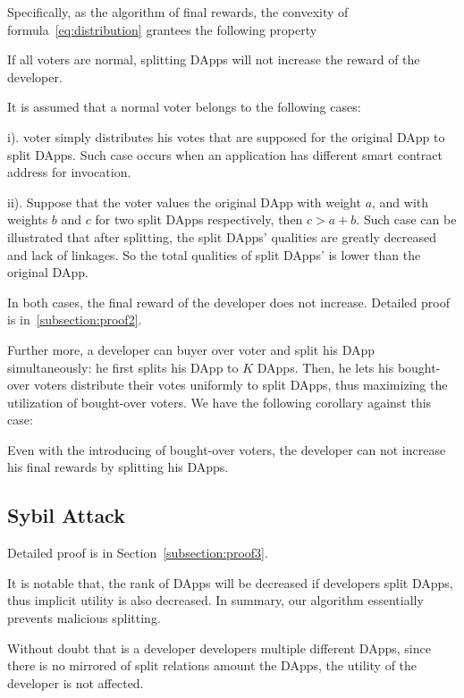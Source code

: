 Specifically, as the algorithm of final rewards, the convexity of formula~\ref{eq:distribution} grantees the following property
\begin{property}
	\label{p2}
    If all voters are normal, splitting DApps will not increase the reward of the developer.
\end{property}
It is assumed that a normal voter belongs to the following cases:
\begin{inparaenum}
\item[i).] voter simply distributes his votes that are supposed for the original DApp to split DApps. Such case occurs when an application has different smart contract address for invocation.
\item[ii).] Suppose that the voter values the original DApp with weight $a$, and with weights $b$ and $c$ for two split DApps respectively, then $c>a+b$. Such case can be illustrated that after splitting, the split DApps' qualities are greatly decreased and lack of linkages. So the total qualities of split DApps' is lower than the original DApp.
 \end{inparaenum}

  In both cases, the final reward of the developer does not increase. Detailed proof  is in~\ref{subsection:proof2}.

Further more, a developer can buyer over voter and split his DApp simultaneously: he first splits his DApp to $K$ DApps. Then, he lets his bought-over voters distribute their votes uniformly to split DApps, thus  maximizing the utilization of  bought-over  voters. We have the following corollary against this case:
\begin{corollary}
	\label{c1}
	Even with the introducing of bought-over voters, the developer can not increase his final rewards by splitting his DApps.
\end{corollary}
\subsection{Sybil Attack}
Detailed proof is in Section~\ref{subsection:proof3}.

It is notable that, the rank of DApps will be decreased if developers split DApps, thus implicit utility is also decreased. In summary, our algorithm essentially prevents malicious splitting.

Without doubt that is a developer developers multiple different  DApps, since there is no mirrored of split relations amount the DApps, the utility of the developer is not affected.

